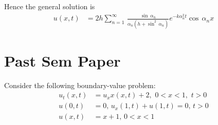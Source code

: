 Hence the general solution is
\begin{align*}
u(x,t)&=2h\sum_{n=1}^\infty\,\frac{\sin\,\alpha_n}{\alpha_n(h+\sin^2\,\alpha_n)}e^{-k\alpha^2_nt}\cos\,\alpha_nx
\end{align*}
\section{Past Sem Paper}
\begin{prob}
\end{prob}
Consider the following boundary-value problem:
\begin{align*}
u_t(x,t)&=u_xx(x,t)+2,\,\,0<x<1,\,\,t>0\\
u(0,t)&=0,\,u_x(1,t)+u(1,t)=0,\,t>0\\
u(x,t)&=x+1, \,0<x<1
\end{align*}

